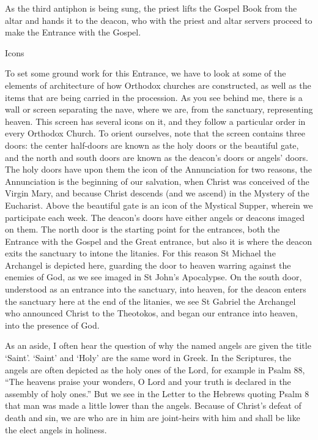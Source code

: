 \documentclass[
]{article}
\begin{document}
As the third antiphon is being sung, the priest lifts the Gospel Book
from the altar and hands it to the deacon, who with the priest and altar
servers proceed to make the Entrance with the Gospel.

Icons

To set some ground work for this Entrance, we have to look at some of
the elements of architecture of how Orthodox churches are constructed,
as well as the items that are being carried in the procession. As you
see behind me, there is a wall or screen separating the nave, where we
are, from the sanctuary, representing heaven. This screen has several
icons on it, and they follow a particular order in every Orthodox
Church. To orient ourselves, note that the screen contains three doors:
the center half-doors are known as the holy doors or the beautiful gate,
and the north and south doors are known as the deacon's doors or angels'
doors. The holy doors have upon them the icon of the Annunciation for
two reasons, the Annunciation is the beginning of our salvation, when
Christ was conceived of the Virgin Mary, and because Christ descends
(and we ascend) in the Mystery of the Eucharist. Above the beautiful
gate is an icon of the Mystical Supper, wherein we participate each
week. The deacon's doors have either angels or deacons imaged on them.
The north door is the starting point for the entrances, both the
Entrance with the Gospel and the Great entrance, but also it is where
the deacon exits the sanctuary to intone the litanies. For this reason
St Michael the Archangel is depicted here, guarding the door to heaven
warring against the enemies of God, as we see imaged in St John's
Apocalypse. On the south door, understood as an entrance into the
sanctuary, into heaven, for the deacon enters the sanctuary here at the
end of the litanies, we see St Gabriel the Archangel who announced
Christ to the Theotokos, and began our entrance into heaven, into the
presence of God.

As an aside, I often hear the question of why the named angels are given
the title `Saint'. `Saint' and `Holy' are the same word in Greek. In the
Scriptures, the angels are often depicted as the holy ones of the Lord,
for example in Psalm 88, ``The heavens praise your wonders, O Lord and
your truth is declared in the assembly of holy ones.'' But we see in the
Letter to the Hebrews quoting Psalm 8 that man was made a little lower
than the angels. Because of Christ's defeat of death and sin, we are who
are in him are joint-heirs with him and shall be like the elect angels
in holiness.
\end{document}
